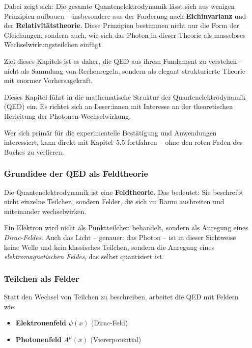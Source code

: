 Dabei zeigt sich: Die gesamte Quantenelektrodynamik lässt sich aus wenigen Prinzipien aufbauen – insbesondere aus der Forderung nach \textbf{Eichinvarianz} und der \textbf{Relativitätstheorie}. Diese Prinzipien bestimmen nicht nur die Form der Gleichungen, sondern auch, wie sich das Photon in dieser Theorie als masseloses Wechselwirkungsteilchen einfügt.

Ziel dieses Kapitels ist es daher, die QED aus ihrem Fundament zu verstehen – nicht als Sammlung von Rechenregeln, sondern als elegant strukturierte Theorie mit enormer Vorhersagekraft.
\medskip
\begin{tcolorbox}[hinweisbox, title=Hinweis für Leser:innen]
	\label{box:Hinweis füe Leser}
	Dieses Kapitel führt in die mathematische Struktur der Quantenelektrodynamik (QED) ein. Es richtet sich an Leser:innen mit Interesse an der theoretischen Herleitung der Photonen-Wechselwirkung. 
	
	Wer sich primär für die experimentelle Bestätigung und Anwendungen interessiert, kann direkt mit Kapitel~5.5 fortfahren – ohne den roten Faden des Buches zu verlieren.
\end{tcolorbox}

\subsubsection{Grundidee der QED als Feldtheorie}

Die Quantenelektrodynamik ist eine \textbf{Feldtheorie}. Das bedeutet: Sie beschreibt nicht einzelne Teilchen, sondern Felder, die sich im Raum ausbreiten und miteinander wechselwirken.

Ein Elektron wird nicht als Punktteilchen behandelt, sondern als Anregung eines \emph{Dirac-Feldes}. Auch das Licht – genauer: das Photon – ist in dieser Sichtweise keine Welle und kein klassisches Teilchen, sondern die Anregung eines \emph{elektromagnetischen Feldes}, das selbst quantisiert ist.

\subsubsection*{Teilchen als Felder}
Statt den Wechsel von Teilchen zu beschreiben, arbeitet die QED mit Feldern wie:
\begin{itemize}
	\item \textbf{Elektronenfeld} $\psi(x)$ (Dirac-Feld)
	\item \textbf{Photonenfeld} $A^\mu(x)$ (Viererpotential)
\end{itemize}

